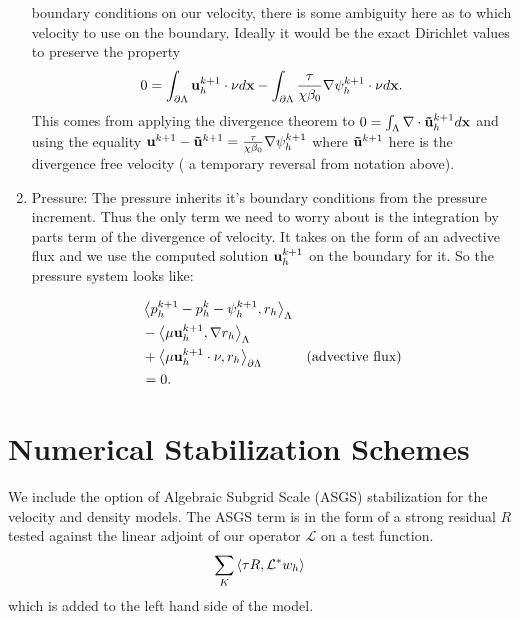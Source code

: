 \documentclass[letterpaper]{erdc}
\begin{document}
\begin{enumerate}
boundary conditions on our velocity, there is some ambiguity here as to which
velocity to use on the boundary.  Ideally it would be the exact Dirichlet
values to preserve the property
\begin{align}
  0 = \int_{\partial\Lambda} \textbf{u}^{k+1}_h \cdot \nu d\textbf{x} - \int_{\partial\Lambda} \frac{\tau}{\chi\beta_0}\nabla\psi^{k+1}_h\cdot\nu d\textbf{x}.
\end{align}
This comes from applying the divergence theorem to
$0 = \int_{\Lambda} \nabla\cdot \mathbf{\tilde{u}}^{k+1}_h d\textbf{x}$ and using the equality
$\textbf{u}^{k+1} - \mathbf{\tilde{u}}^{k+1} = \frac{\tau}{\chi\beta_0}\nabla\psi^{k+1}_h$ where
$\mathbf{\tilde{u}}^{k+1}$ here is the divergence free velocity ( a temporary reversal from
notation above).


\item Pressure: The pressure inherits it's boundary conditions from the
  pressure increment.  Thus the only term we need to worry about is the
  integration by parts term of the divergence of velocity.  It takes on the
  form of an advective flux and we use the computed solution $\textbf{u}^{k+1}_h$ on
  the boundary for it.  So the pressure system looks like:

\begin{align*}
 &\left\langle  p^{k+1}_h - p_h^{k} - \psi_h^{k+1},  r_h \right\rangle_{\Lambda} &\\
  &- \left\langle  \mu \textbf{u}^{k+1}_h,  \nabla r_h  \right\rangle_{\Lambda} &\\
  &+ \left\langle  \mu \textbf{u}^{k+1}_h\cdot\nu,  r_h  \right\rangle_{\partial\Lambda}        &\mbox{(advective flux)}\\
  & = 0.&
\end{align*}


\end{enumerate}


\section{Numerical Stabilization Schemes}
\label{sec:Stabilization}

We include the option of Algebraic Subgrid Scale (ASGS) stabilization for the
velocity and density models.  The ASGS term is in the form of a strong residual
$R$ tested against the linear adjoint of our operator $\mathcal{L}$ on a test
function.
\begin{equation}
  \displaystyle\sum_{K}\left\langle \tau R, \mathcal{L}^{*}w_h \right\rangle
\end{equation}
which is added to the left hand side of the model.  
\end{document}

